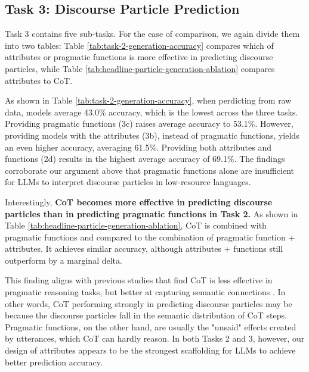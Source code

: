 \documentclass[11pt]{article}
\begin{document}
\subsection{Task 3: Discourse Particle Prediction}
Task 3 contains five sub-tasks. For the ease of comparison, we again divide them into two tables: Table \ref{tab:task-2-generation-accuracy} compares which of attributes or pragmatic functions is more effective in predicting discourse particles, while Table \ref{tab:headline-particle-generation-ablation} compares attributes to CoT.


As shown in Table \ref{tab:task-2-generation-accuracy}, when perdicting from raw data, models average 43.0\% accuracy, which is the lowest across the three tasks. 
Providing pragmatic functions (3c) raises average accuracy to 53.1\%. However, providing models with the attributes (3b), instead of pragmatic functions, yields an even higher accuracy, averaging 61.5\%. Providing both attributes and functions (2d) results in the highest average accuracy of 69.1\%. The findings corroborate our argument above that pragmatic functions alone are insufficient for LLMs to interpret discourse particles in low-resource languages. 

Interestingly, \textbf{CoT becomes more effective in predicting discourse particles than in predicting pragmatic functions in Task 2.} As shown in Table \ref{tab:headline-particle-generation-ablation}, CoT is combined with pragmatic functions and compared to the combination of pragmatic function + attributes. It achieves similar accuracy, although attributes + functions still outperform by a marginal delta. 

This finding aligns with previous studies that find CoT is less effective in pragmatic reasoning tasks, but better at capturing semantic connections \cite{chen-wang-2025-pragmatic}. In other words, CoT performing strongly in predicting discourse particles may be because the discourse particles fall in the semantic distribution of CoT steps. Pragmatic functions, on the other hand, are usually the "unsaid" effects created by utterances, which CoT can hardly reason. In both Tasks 2 and 3, however, our design of attributes appears to be the strongest scaffolding for LLMs to achieve better prediction accuracy.
\end{document}
